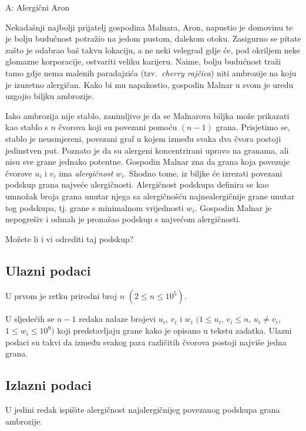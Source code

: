 \begin{statement}[
  timelimit=1 s,
  memorylimit=512 MiB,
]{A: Alergični Aron}

Nekadašnji najbolji prijatelj gospodina Malnara, Aron, napustio je domovinu te
je bolju budućnost potražio na jedom pustom, dalekom otoku. Zasigurno se pitate
zašto je odabrao baš takvu lokaciju, a ne neki velegrad gdje će, pod okriljem
neke glomazne korporacije, ostvariti veliku karijeru. Naime, bolju budućnost
traži tamo gdje nema malenih paradajzića (tzv.\ \textit{cherry rajčica}) niti
ambrozije na koju je izuzetno alergičan. Kako bi mu napakostio, gospodin Malnar
u svom je uredu uzgojio biljku ambrozije.

Iako ambrozija nije stablo, zanimljivo je da se Malnarova biljka može prikazati
kao stablo s $n$ čvorova koji su povezani pomoću $(n-1)$ grana. Prisjetimo se,
stablo je neusmjereni, povezani graf u kojem između svaka dva čvora postoji
jedinstven put. Poznato je da su
alergeni koncentrirani upravo na granama, ali nisu sve grane jednako potentne.
Gospodin Malnar zna da grana koja povezuje čvorove $u_i$ i $v_i$ ima
\textit{alergičnost} $w_i$. Shodno tome, iz biljke će izrezati povezani podskup
grana najveće alergičnosti. Alergičnost podskupa definira se kao umnožak broja
grana unutar njega sa alergičnošću najnealergičnije grane unutar tog podskupa,
tj. grane s minimalnom vrijednosti $w_i$. Gospodin Malnar je nepogrešiv i odmah
je pronašao podskup s najvećom alergičnosti.

Možete li i vi odrediti taj podskup?

\subsection*{Ulazni podaci}
U prvom je retku prirodni broj $n$ $(2 \le n \le 10^5)$.

U sljedećih se $n-1$ redaka nalaze brojevi $u_i$, $v_i$ i $w_i$
$(1 \le u_i$, $v_i \le n$, $u_i \neq v_i$, $1 \le w_i \le 10^9)$ koji
predstavljaju grane kako je opisano u tekstu zadatka. Ulazni podaci su
takvi da između svakog para različitih čvorova postoji najviše jedna
grana.

\subsection*{Izlazni podaci}
U jedini redak ispišite alergičnost najalergičnijeg povezanog podskupa
grana ambrozije.


\end{statement}
